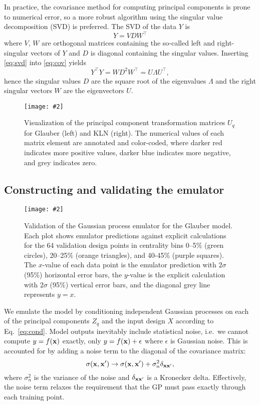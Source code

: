 \documentclass[aps,prc,reprint,superscriptaddress,amsmath]{revtex4-1}
\newcommand{\colfig}[3][t]{
  \begin{figure}[#1]
    \texttt{[image: \#2]}
    \caption{\label{fig:#2}#3}
  \end{figure}
}
\newcommand{\widefig}[3][t]{
  \begin{figure*}[#1]
    \texttt{[image: \#2]}
    \caption{\label{fig:#2}#3}
  \end{figure*}
}
\newcommand{\tran}{^\intercal}
\begin{document}
In practice, the covariance method for computing principal components is prone to numerical error, so a more robust algorithm using the singular value decomposition (SVD) is preferred.
The SVD of the data $Y$ is
\begin{equation}
  Y = VDW\tran
  \label{eq:svd}
\end{equation}
where $V$, $W$ are orthogonal matrices containing the so-called left and right-singular vectors of $Y$ and $D$ is diagonal containing the singular values.
Inserting \eqref{eq:svd} into \eqref{eq:cov} yields
\begin{equation}
  Y\tran Y = W D^2 W\tran = U \Lambda U\tran,
\end{equation}
hence the singular values $D$ are the square root of the eigenvalues $\Lambda$ and the right singular vectors $W$ are the eigenvectors $U$.

\colfig[b]{pc_matrix}{
  Visualization of the principal component transformation matrices $U_q$ for Glauber (left) and KLN (right).
  The numerical values of each matrix element are annotated and color-coded, where darker red indicates more positive values, darker blue indicates more negative, and grey indicates zero.
}

\subsection{Constructing and validating the emulator}

\widefig{validation}{
  Validation of the Gaussian process emulator for the Glauber model.
  Each plot shows emulator predictions against explicit calculations for the 64 validation design points in centrality bins 0--5\% (green circles), 20--25\% (orange triangles), and 40-45\% (purple squares).
  The $x$-value of each data point is the emulator prediction with $2\sigma$ (95\%) horizontal error bars, the $y$-value is the explicit calculation with $2\sigma$ (95\%) vertical error bars, and the diagonal grey line represents $y = x$.
}

We emulate the model by conditioning independent Gaussian processes on each of the principal components $Z_q$ and the input design $X$ according to Eq.~\eqref{eq:cond}.
Model outputs inevitably include statistical noise, i.e.\ we cannot compute $y = f(\mathbf x)$ exactly, only $y = f(\mathbf x) + \epsilon$ where $\epsilon$ is Gaussian noise.
This is accounted for by adding a noise term to the diagonal of the covariance matrix:
\begin{equation*}
  \sigma(\mathbf x, \mathbf x') \rightarrow \sigma(\mathbf x, \mathbf x') + \sigma^2_n\delta_{\mathbf x\mathbf x'},
\end{equation*}
where $\sigma^2_n$ is the variance of the noise and $\delta_{\mathbf x\mathbf x'}$ is a Kronecker delta.
Effectively, the noise term relaxes the requirement that the GP must pass exactly through each training point.
\end{document}
